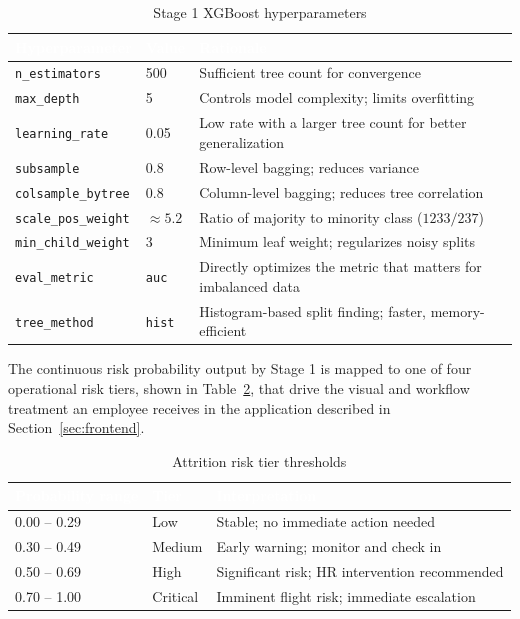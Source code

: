 \documentclass[11pt,a4paper]{article}
\newcommand{\hdrow}{\rowcolor{TPnavy}}
\newcommand{\hdtxt}[1]{\textcolor{white}{\bfseries #1}}
\newcommand{\code}[1]{\texttt{\footnotesize #1}}
\begin{document}
\begin{table}[H]
\centering
\caption{Stage 1 XGBoost hyperparameters}
\label{tab:mod3-hyperparams}
\small
\begin{tabular}{p{3.4cm}p{2.2cm}p{8.2cm}}
\toprule
\hdrow \hdtxt{Hyperparameter} & \hdtxt{Value} & \hdtxt{Rationale} \\
\midrule
\code{n\_estimators} & 500 & Sufficient tree count for convergence \\
\rowcolor{TPlight}
\code{max\_depth} & 5 & Controls model complexity; limits overfitting \\
\code{learning\_rate} & 0.05 & Low rate with a larger tree count for better generalization \\
\rowcolor{TPlight}
\code{subsample} & 0.8 & Row-level bagging; reduces variance \\
\code{colsample\_bytree} & 0.8 & Column-level bagging; reduces tree correlation \\
\rowcolor{TPlight}
\code{scale\_pos\_weight} & $\approx 5.2$ & Ratio of majority to minority class ($1233/237$) \\
\code{min\_child\_weight} & 3 & Minimum leaf weight; regularizes noisy splits \\
\rowcolor{TPlight}
\code{eval\_metric} & \code{auc} & Directly optimizes the metric that matters for imbalanced data \\
\code{tree\_method} & \code{hist} & Histogram-based split finding; faster, memory-efficient \\
\bottomrule
\end{tabular}
\end{table}

The continuous risk probability output by Stage 1 is mapped to one of four operational risk tiers, shown in Table~\ref{tab:mod3-tiers}, that drive the visual and workflow treatment an employee receives in the application described in Section~\ref{sec:frontend}.

\begin{table}[H]
\centering
\caption{Attrition risk tier thresholds}
\label{tab:mod3-tiers}
\small
\begin{tabular}{llp{7.5cm}}
\toprule
\hdrow \hdtxt{Probability range} & \hdtxt{Tier} & \hdtxt{Interpretation} \\
\midrule
0.00 -- 0.29 & Low & Stable; no immediate action needed \\
\rowcolor{TPlight}
0.30 -- 0.49 & Medium & Early warning; monitor and check in \\
0.50 -- 0.69 & High & Significant risk; HR intervention recommended \\
\rowcolor{TPlight}
0.70 -- 1.00 & Critical & Imminent flight risk; immediate escalation \\
\bottomrule
\end{tabular}
\end{table}
\end{document}
